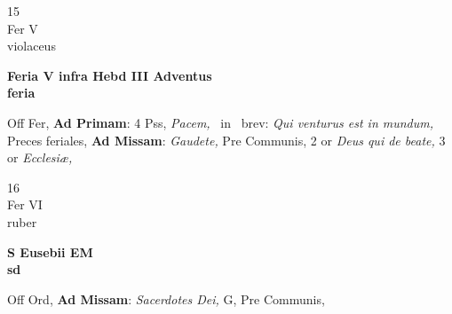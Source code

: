 \documentclass[10pt, openany]{book}
\begin{document}
        \begin{center}
            \begin{minipage}{3.5in}
                \vspace{2em}
                \begin{minipage}{0.5in}
                    {\Huge 15} \\
                    {\normalsize Fer V} \\
                    {\normalsize violaceus}
                \end{minipage}
                \begin{minipage}{3.0in}
                    \textbf{ \large Feria V infra Hebd III Adventus \\
                    \textnormal{\normalsize feria}} \\ 
                \end{minipage}
                \begin{justify}Off Fer, \textbf{Ad Primam}: 4 Pss, \textit{Pacem,} \Vbar\ in \Rbar\ brev: \textit{Qui venturus est in mundum,} Preces feriales, \textbf{Ad Missam}: \textit{Gaudete,} Pre Communis, 2 or \textit{Deus qui de beate,} 3 or \textit{Ecclesiæ,}  
                \end{justify}
            \end{minipage}
        \end{center}
    
        \begin{center}
            \begin{minipage}{3.5in}
                \vspace{2em}
                \begin{minipage}{0.5in}
                    {\Huge 16} \\
                    {\normalsize Fer VI} \\
                    {\normalsize ruber}
                \end{minipage}
                \begin{minipage}{3.0in}
                    \textbf{ \large S Eusebii EM \\
                    \textnormal{\normalsize sd}} \\ 
                \end{minipage}
                \begin{justify}Off Ord, \textbf{Ad Missam}: \textit{Sacerdotes Dei,} G, Pre Communis,  
                \end{justify}
            \end{minipage}
        \end{center}
    
\end{document}
